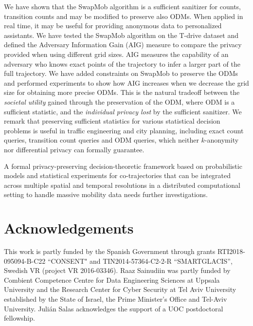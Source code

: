 \documentclass[times,twocolumn,final,authoryear]{elsarticle}
\begin{document}
We have shown that the SwapMob algorithm is a sufficient sanitizer for counts, transition counts and may be modified to preserve also ODMs.
When applied in real time, it may be useful for providing anonymous data to personalized assistants. 
We have tested the SwapMob algorithm on the T-drive dataset and defined 
the Adversary Information Gain (AIG) measure to compare the privacy provided when using different grid sizes.
AIG measures the capability of an adversary who knows exact points of the trajectory to infer a larger part of the full trajectory.
We have added constraints on SwapMob to preserve the ODMs and performed experiments to show how AIG
increases when we decrease the grid size for obtaining more precise ODMs.
This is the natural tradeoff between the {\em societal utility} gained through the preservation of the ODM, where ODM is a sufficient statistic, and the {\em individual privacy lost} by the sufficient sanitizer. 
We remark that preserving sufficient statistics for various statistical decision problems is useful in traffic engineering and city planning, including exact count queries, transition count queries and ODM queries, which neither $k$-anonymity nor differential privacy can formally guarantee.


A formal privacy-preserving decision-theoretic framework based on probabilistic models and statistical experiments for co-trajectories that can be integrated across multiple spatial and temporal resolutions in a distributed computational setting to handle massive mobility data needs further investigations.

\section*{Acknowledgements}
This work is partly funded by the Spanish Government through grants  RTI2018-095094-B-C22 ``CONSENT" and TIN2014-57364-C2-2-R ``SMARTGLACIS'', Swedish VR (project VR 2016-03346). Raaz Sainudiin was partly funded by Combient Competence Centre for Data Engineering Sciences at Uppsala University and the Research Center for Cyber Security at Tel Aviv University established by the State of Israel, the Prime Minister's Office and Tel-Aviv University. 
Juli\'{a}n Salas acknowledges the support of a UOC postdoctoral fellowship.






\end{document}
